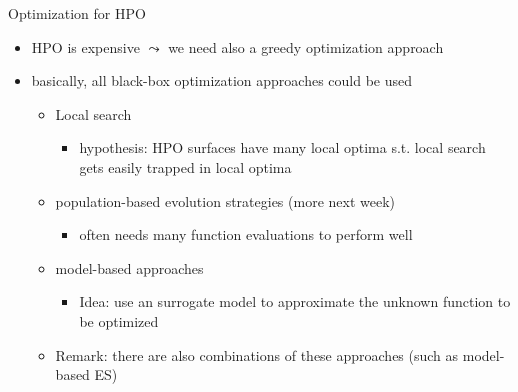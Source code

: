 \begin{frame}[c,fragile]{Optimization for HPO}

\begin{itemize}
	\item HPO is expensive $\leadsto$ we need also a greedy optimization approach
	\item basically, all black-box optimization approaches could be used
	\begin{itemize}
		\item Local search
		\begin{itemize}
			\item hypothesis: HPO surfaces have many local optima s.t. local search gets easily trapped in local optima
		\end{itemize}
	 	\medskip
		\item population-based evolution strategies (more next week)
		\begin{itemize}
			\item often needs many function evaluations to perform well
		\end{itemize}
		\medskip
		\item model-based approaches
		\begin{itemize}
			\item Idea: use an surrogate model to approximate the unknown function to be optimized
		\end{itemize}
	    \item Remark: there are also combinations of these approaches (such as model-based ES)
	\end{itemize}
\end{itemize}

\end{frame}
